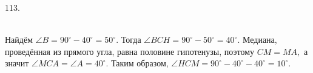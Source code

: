 113. \begin{figure}[ht!]
\end{figure}\\
Найдём $\angle B=90^\circ-40^\circ=50^\circ.$ Тогда $\angle BCH=90^\circ-50^\circ=40^\circ.$ Медиана, проведённая из прямого угла, равна половине гипотенузы, поэтому $CM=MA,$ а значит $\angle MCA=\angle A=40^\circ.$ Таким образом, $\angle HCM=90^\circ-40^\circ-40^\circ=10^\circ.$\\
